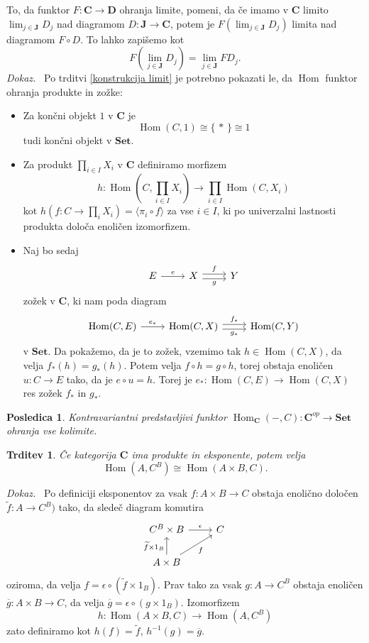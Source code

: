 \documentclass[12pt,a4paper]{book}
\theoremstyle{definition}
\theoremstyle{plain}
\newtheorem{trditev}[definicija]{Trditev}
\newtheorem{posledica}{Posledica}[definicija]
\newenvironment{dokaz}{\emph{Dokaz.}\ }{\hspace{\fill}{$\Box$}}
\theoremstyle{definition}
\theoremstyle{remark}
\newcommand{\cat}[1]{\textbf{#1}}
\DeclareMathOperator{\Hom}{Hom}
\renewcommand{\set}[1]{\{\,#1\,\}}
\newcommand{\fprod}[1]{\langle #1 \rangle}
\begin{document}
To, da funktor $F : \cat{C} \to \cat{D}$ ohranja limite, pomeni, da če imamo v $\cat{C}$ limito $\lim_{j \in \cat{J}}D_j$
nad diagramom $D : \cat{J} \to \cat{C}$, potem je $F(\lim_{j \in \cat{J}}D_j)$ limita nad diagramom $F \circ D$. To lahko zapišemo kot
$$F(\lim_{j \in \cat{J}}D_j) = \lim_{j \in \cat{J}}FD_j.$$ 
\begin{dokaz}
Po trditvi \ref{konstrukcija limit} je potrebno pokazati le, da $\Hom$ funktor ohranja produkte in zožke:
%
\begin{itemize}
\item Za končni objekt $1$ v $\cat{C}$ je 
$$\Hom(C,1) \cong \set{*} \cong 1$$
tudi končni objekt v $\cat{Set}.$
\item Za produkt $\prod_{i \in I} X_i$ v $\cat{C}$ definiramo morfizem
$$h : \Hom(C, \prod_{i \in I} X_i) \to \prod_{i \in I} \Hom(C, X_i)$$
kot $h(f : C \to \prod_i X_i) = \fprod{\pi_i \circ f}$ za vse $i \in I$, ki po univerzalni lastnosti produkta določa enoličen izomorfizem.
\item Naj bo sedaj
$$ \begin{tikzcd}[sep=normal]
E \ar[r, "e"] & X \ar[r, shift left, "f"] \ar[r, shift right, "g"'] & Y
\end{tikzcd} $$
zožek v $\cat{C}$, ki nam poda diagram
$$ \begin{tikzcd}[sep=normal]
\Hom(C,E) \ar[r, "e_*"] & \Hom(C,X) \ar[r, shift left, "f_*"] \ar[r, shift right, "g_*"'] & \Hom(C,Y)
\end{tikzcd} $$
v $\cat{Set}$. Da pokažemo, da je to zožek, vzemimo tak $h \in \Hom(C,X)$, da velja $f_*(h) = g_*(h)$. Potem velja $f \circ h = g \circ h$, torej obstaja enoličen $u : C \to E$ tako, da je $e \circ u = h$. Torej je $e_* : \Hom(C,E) \to \Hom(C,X)$ res zožek $f_*$ in $g_*$.
\end{itemize}
\end{dokaz}

\begin{posledica}
Kontravariantni predstavljivi funktor $\Hom_\cat{C}(-,C) : \cat{C}^{op} \to \cat{Set}$ ohranja vse kolimite.
\end{posledica}

\begin{trditev}
Če kategorija $\cat{C}$ ima produkte in eksponente, potem velja
$$\Hom(A, C^B) \cong \Hom(A \times B, C).$$
\end{trditev}
\begin{dokaz}
Po definiciji eksponentov za vsak $f: A \times B \to C$ obstaja enolično določen $\widetilde{f} : A \to C^B)$ tako, da sledeč diagram komutira
$$
\begin{tikzcd}
C^B \times B \ar[r, "\epsilon"] & C \\
A \times B \ar[u, "\widetilde{f} \times 1_B"] \ar[ur, "f"']
\end{tikzcd}
$$
oziroma, da velja $f = \epsilon \circ (\widetilde{f} \times 1_B)$. Prav tako za vsak $g : A \to C^B$ obstaja enoličen $\overline{g}: A \times B \to C$, da velja $\overline{g} = \epsilon \circ (g \times 1_B)$. 
Izomorfizem 
$$h : \Hom(A \times B, C) \to \Hom(A, C^B)$$
zato definiramo kot $h(f) = \widetilde{f}$, $h^{-1}(g) = \overline{g}$.
\end{dokaz}
\end{document}
